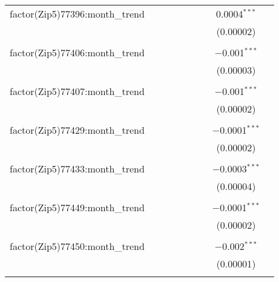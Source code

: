 \begin{table}[H]
{\begin{tabular}{@{\extracolsep{5pt}}lcccccccc}
  factor(Zip5)77396:month\_trend &  &  &  &  &  &  & 0.0004$^{***}$ &  \\  

   &  &  &  &  &  &  & (0.00002) &  \\  

   & & & & & & & & \\  

  factor(Zip5)77406:month\_trend &  &  &  &  &  &  & $-$0.001$^{***}$ &  \\  

   &  &  &  &  &  &  & (0.00003) &  \\  

   & & & & & & & & \\  

  factor(Zip5)77407:month\_trend &  &  &  &  &  &  & $-$0.001$^{***}$ &  \\  

   &  &  &  &  &  &  & (0.00002) &  \\  

   & & & & & & & & \\  

  factor(Zip5)77429:month\_trend &  &  &  &  &  &  & $-$0.0001$^{***}$ &  \\  

   &  &  &  &  &  &  & (0.00002) &  \\  

   & & & & & & & & \\  

  factor(Zip5)77433:month\_trend &  &  &  &  &  &  & $-$0.0003$^{***}$ &  \\  

   &  &  &  &  &  &  & (0.00004) &  \\  

   & & & & & & & & \\  

  factor(Zip5)77449:month\_trend &  &  &  &  &  &  & $-$0.0001$^{***}$ &  \\  

   &  &  &  &  &  &  & (0.00002) &  \\  

   & & & & & & & & \\  

  factor(Zip5)77450:month\_trend &  &  &  &  &  &  & $-$0.002$^{***}$ &  \\  

   &  &  &  &  &  &  & (0.00001) &  \\  

   & & & & & & & & \\  


\end{tabular}}
\end{table}
